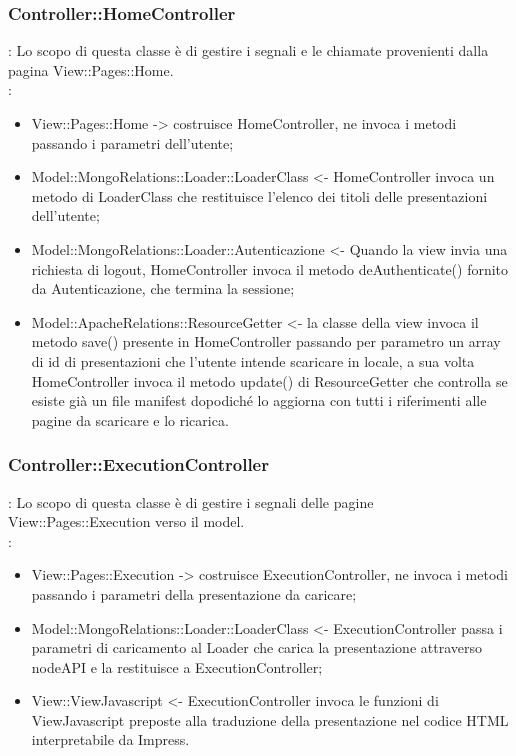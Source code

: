 {	\subsubsection{Controller::HomeController}{
				\textbf{\tipo}: Lo scopo di questa classe è di gestire i segnali e le chiamate provenienti dalla pagina View::Pages::Home.\\	
				\textbf{\relaz}:
				\begin{itemize}
					\item View::Pages::Home -> costruisce HomeController, ne invoca i metodi passando i parametri dell’utente;
					\item Model::MongoRelations::Loader::LoaderClass <- HomeController invoca un metodo di LoaderClass che restituisce l’elenco dei titoli delle presentazioni dell’utente;
					\item Model::MongoRelations::Loader::Autenticazione <- Quando la view invia una richiesta di logout, HomeController invoca il metodo deAuthenticate() fornito da Autenticazione, che termina la sessione;
					\item Model::ApacheRelations::ResourceGetter <- la classe della view invoca il metodo save() presente in  HomeController passando per parametro un array di id di presentazioni che l'utente intende scaricare in locale, a sua volta HomeController invoca il metodo update() di ResourceGetter che controlla se esiste già un file manifest dopodiché lo aggiorna con tutti i riferimenti alle pagine da scaricare e lo ricarica. 					
				\end{itemize} 
			}
		\subsubsection{Controller::ExecutionController}{
				\textbf{\tipo}: Lo scopo di questa classe è di gestire i segnali delle pagine View::Pages::Execution verso il model.\\	
				\textbf{\relaz}:
					\begin{itemize}
						\item View::Pages::Execution -> costruisce ExecutionController, ne invoca i metodi passando i parametri della presentazione da caricare;
						\item Model::MongoRelations::Loader::LoaderClass <- ExecutionController passa i parametri di caricamento al Loader che carica la presentazione attraverso nodeAPI e la restituisce a ExecutionController;
						\item View::ViewJavascript <- ExecutionController invoca le funzioni di ViewJavascript preposte alla traduzione della presentazione nel codice HTML interpretabile da Impress.
					\end{itemize}
		}
		
}
